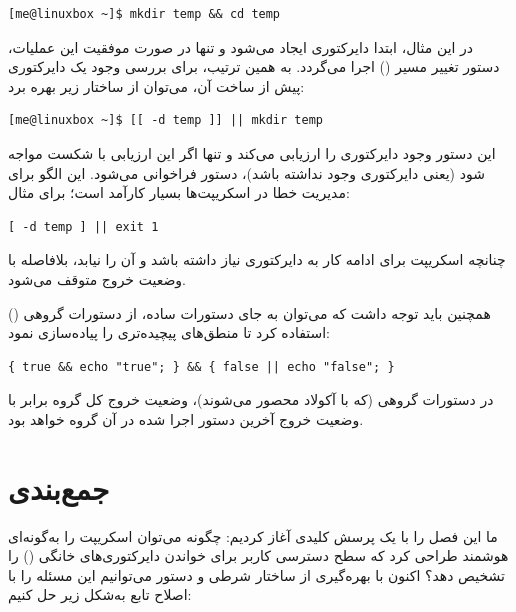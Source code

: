 \begin{latin}
\begin{lstlisting}
[me@linuxbox ~]$ mkdir temp && cd temp
\end{lstlisting}
\end{latin}

در این مثال، ابتدا دایرکتوری  ایجاد می‌شود و تنها در صورت موفقیت این عملیات، دستور تغییر مسیر () اجرا می‌گردد. به همین ترتیب، برای بررسی وجود یک دایرکتوری پیش از ساخت آن، می‌توان از ساختار زیر بهره برد:

\begin{latin}
\begin{lstlisting}
[me@linuxbox ~]$ [[ -d temp ]] || mkdir temp
\end{lstlisting}
\end{latin}

این دستور وجود دایرکتوری  را ارزیابی می‌کند و تنها اگر این ارزیابی با شکست مواجه شود (یعنی دایرکتوری وجود نداشته باشد)، دستور  فراخوانی می‌شود. این الگو برای مدیریت خطا در اسکریپت‌ها بسیار کارآمد است؛ برای مثال:

\begin{latin}
\begin{lstlisting}
[ -d temp ] || exit 1
\end{lstlisting}
\end{latin}

چنانچه اسکریپت برای ادامه کار به دایرکتوری  نیاز داشته باشد و آن را نیابد، بلافاصله با وضعیت خروج  متوقف می‌شود.

همچنین باید توجه داشت که می‌توان به جای دستورات ساده، از دستورات گروهی () استفاده کرد تا منطق‌های پیچیده‌تری را پیاده‌سازی نمود:

\begin{latin}
\begin{lstlisting}
{ true && echo "true"; } && { false || echo "false"; }
\end{lstlisting}
\end{latin}

در دستورات گروهی (که با آکولاد \cmd{\{ \}} محصور می‌شوند)، وضعیت خروج کل گروه برابر با وضعیت خروج آخرین دستور اجرا شده در آن گروه خواهد بود.

\section{جمع‌بندی}

ما این فصل را با یک پرسش کلیدی آغاز کردیم: چگونه می‌توان اسکریپت  را به‌گونه‌ای هوشمند طراحی کرد که سطح دسترسی کاربر برای خواندن دایرکتوری‌های خانگی () را تشخیص دهد؟ اکنون با بهره‌گیری از ساختار شرطی  و دستور \cmd{[[ ]]} می‌توانیم این مسئله را با اصلاح تابع  به‌شکل زیر حل کنیم:

